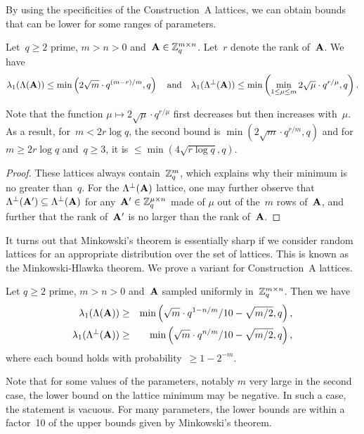 By using the specificities of the Construction~A lattices, we can obtain bounds that can be lower for some ranges of parameters. 

\begin{lemma}
\label{le:Minko_constA}
Let~$q\geq 2$ prime, $m>n>0$ and~${\bf A} \in \mathbb{Z}_q^{m \times n}$. Let~$r$ 
denote the rank of~${\bf A}$. 
We have 
\[
\lambda_1( \Lambda({\bf A}))  \leq 
 \min \left( 2\sqrt{m}  \cdot  q^{(m-r)/m}, q \right) \ \  \mbox{ and } \ \ 
\lambda_1 (\Lambda^{\perp}({\bf A})) \leq  \min\left( \min_{1 \leq  \mu \leq m} 2 \sqrt{\mu} \cdot  q^{r/\mu}, q\right).
\]
\end{lemma}

Note that the function $\mu \mapsto 2 \sqrt{\mu} \cdot  q^{r/\mu}$ first decreases but then increases with~$\mu$. As a result, 
for~$m < 2 r \log q$, the second bound is $\min(2 \sqrt{m} \cdot  q^{r/m}, q)$ and for $m \geq 2 r \log q$ and~$q \geq 3$, 
it is $\leq \min(4\sqrt{r \log q}, q)$.

\begin{proof}
These lattices always contain~$\mathbb{Z}_q^m$, which explains why their minimum is no greater than~$q$. 
For the $\Lambda^{\perp}({\bf A})$ lattice, one may further observe that $\Lambda^{\perp}({\bf A}') \subseteq \Lambda^{\perp}({\bf A})$  for any~${\bf A}' \in \mathbb{Z}_q^{\mu \times n}$ made of $\mu$ out of the~$m$ rows of~${\bf A}$, and further that the rank of~${\bf A}'$ is no larger than the rank of~${\bf A}$. 
\end{proof}

\begin{comment}
2 (1/2sqr(x) q^r/x + sqrt(x)*r*logq*q^r/x*(-1/x^2))
= q^(r/x) x^(-3/2)  ( x - 2r*logq )
=> decreasing up to x = floor (2r log q)
2sqrt(2rlogq) * exp(rlog q / floor (2r log q))
\end{comment}

It turns out that Minkowski's theorem is essentially sharp if we consider random lattices for an appropriate distribution over the 
set of lattices. This is known as the Minkowski-Hlawka theorem. We prove a variant for Construction~A lattices.

\begin{theorem}
Let $q\geq 2$ prime, $m  > n>0$ and~${\bf A}$ sampled uniformly in~$\mathbb{Z}_q^{m \times n}$. Then we have
\begin{eqnarray*}
            \lambda_1( \Lambda({\bf A})) & \geq  & \min \left(\sqrt{m} \cdot q^{1-n/m}/10 -\sqrt{m/2}, q \right), \\
            \lambda_1( \Lambda^{\perp}({\bf A})) & \geq & \min \left(\sqrt{m} \cdot q^{n/m}/10 -\sqrt{m/2}, q \right),
\end{eqnarray*}
where each bound holds with probability~$\geq 1-2^{-m}$.
\end{theorem}
Note that for some values of the parameters, notably $m$ very large in the second case, 
the lower bound on the lattice minimum may be negative. In such a case, the statement is vacuous. 
For many parameters, the lower bounds are within a factor~10 of the upper bounds given by Minkowski's theorem.

